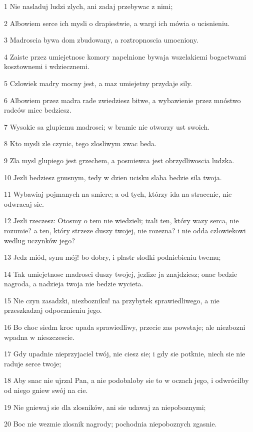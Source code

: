 \par 1 Nie nasladuj ludzi zlych, ani zadaj przebywac z nimi;
\par 2 Albowiem serce ich mysli o drapiestwie, a wargi ich mówia o ucisnieniu.
\par 3 Madroscia bywa dom zbudowany, a roztropnoscia umocniony.
\par 4 Zaiste przez umiejetnosc komory napelnione bywaja wszelakiemi bogactwami kosztownemi i wdziecznemi.
\par 5 Czlowiek madry mocny jest, a maz umiejetny przydaje sily.
\par 6 Albowiem przez madra rade zwiedziesz bitwe, a wybawienie przez mnóstwo radców miec bedziesz.
\par 7 Wysokie sa glupiemu madrosci; w bramie nie otworzy ust swoich.
\par 8 Kto mysli zle czynic, tego zlosliwym zwac beda.
\par 9 Zla mysl glupiego jest grzechem, a posmiewca jest obrzydliwoscia ludzka.
\par 10 Jezli bedziesz gnusnym, tedy w dzien ucisku slaba bedzie sila twoja.
\par 11 Wybawiaj pojmanych na smierc; a od tych, którzy ida na stracenie, nie odwracaj sie.
\par 12 Jezli rzeczesz: Otosmy o tem nie wiedzieli; izali ten, który wazy serca, nie rozumie? a ten, który strzeze duszy twojej, nie rozezna? i nie odda czlowiekowi wedlug uczynków jego?
\par 13 Jedz miód, synu mój! bo dobry, i plastr slodki podniebieniu twemu;
\par 14 Tak umiejetnosc madrosci duszy twojej, jezlize ja znajdziesz; onac bedzie nagroda, a nadzieja twoja nie bedzie wycieta.
\par 15 Nie czyn zasadzki, niezbozniku! na przybytek sprawiedliwego, a nie przeszkadzaj odpocznieniu jego.
\par 16 Bo choc siedm kroc upada sprawiedliwy, przecie zas powstaje; ale niezbozni wpadna w nieszczescie.
\par 17 Gdy upadnie nieprzyjaciel twój, nie ciesz sie; i gdy sie potknie, niech sie nie raduje serce twoje;
\par 18 Aby snac nie ujrzal Pan, a nie podobaloby sie to w oczach jego, i odwrócilby od niego gniew swój na cie.
\par 19 Nie gniewaj sie dla zlosników, ani sie udawaj za niepoboznymi;
\par 20 Boc nie wezmie zlosnik nagrody; pochodnia niepoboznych zgasnie.
